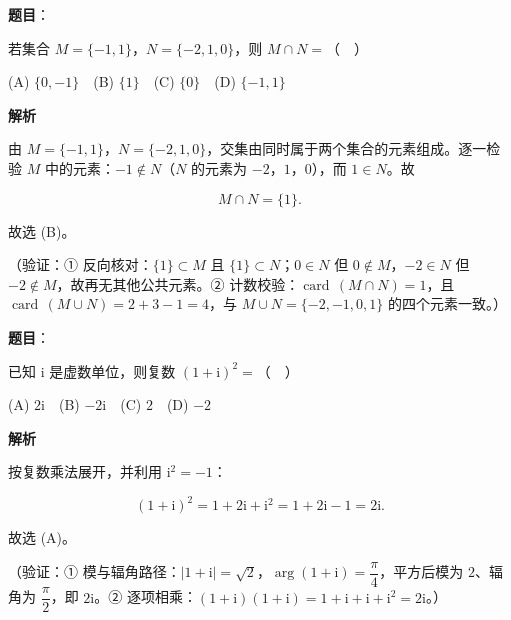 
\begin{answer}

\textbf{题目}：

若集合 \(M=\{-1,1\}\)，\(N=\{-2,1,0\}\)，则 \(M\cap N=\)（　）

(A) \(\{0,-1\}\)　(B) \(\{1\}\)　(C) \(\{0\}\)　(D) \(\{-1,1\}\)

\textbf{解析}

由 \(M=\{-1,1\}\)，\(N=\{-2,1,0\}\)，交集由同时属于两个集合的元素组成。逐一检验 \(M\) 中的元素：\(-1\notin N\)（\(N\) 的元素为 \(-2\)，\(1\)，\(0\)），而 \(1\in N\)。故

\nopagebreak[4]
\[
M\cap N=\{1\}.
\]

故选 (B)。

（验证：① 反向核对：\(\{1\}\subset M\) 且 \(\{1\}\subset N\)；\(0\in N\) 但 \(0\notin M\)，\(-2\in N\) 但 \(-2\notin M\)，故再无其他公共元素。② 计数校验：\(\operatorname{card}\,(M\cap N)=1\)，且 \(\operatorname{card}\,(M\cup N)=2+3-1=4\)，与 \(M\cup N=\{-2,-1,0,1\}\) 的四个元素一致。）


\end{answer}
\begin{answer}

\textbf{题目}：

已知 \(\mathrm{i}\) 是虚数单位，则复数 \((1+\mathrm{i})^2=\)（　）

(A) \(2\mathrm{i}\)　(B) \(-2\mathrm{i}\)　(C) \(2\)　(D) \(-2\)

\textbf{解析}

按复数乘法展开，并利用 \(\mathrm{i}^2=-1\)：

\nopagebreak[4]
\[
(1+\mathrm{i})^2=1+2\mathrm{i}+\mathrm{i}^2=1+2\mathrm{i}-1=2\mathrm{i}.
\]

故选 (A)。

（验证：① 模与辐角路径：\(|1+\mathrm{i}|=\sqrt{2}\)，\(\arg(1+\mathrm{i})=\dfrac{\pi}{4}\)，平方后模为 \(2\)、辐角为 \(\dfrac{\pi}{2}\)，即 \(2\mathrm{i}\)。② 逐项相乘：\((1+\mathrm{i})(1+\mathrm{i})=1+\mathrm{i}+\mathrm{i}+\mathrm{i}^2=2\mathrm{i}\)。）


\end{answer}
